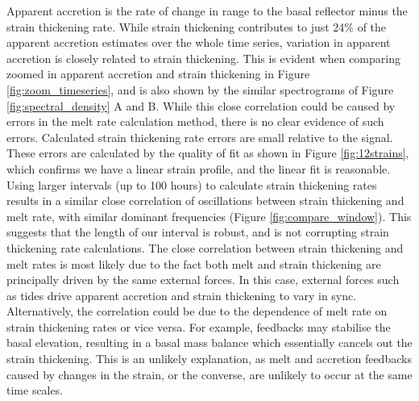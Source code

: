 Apparent accretion is the rate of change in range to the basal reflector minus the strain thickening rate. While strain thickening contributes to just 24\% of the apparent accretion estimates over the whole time series, variation in apparent accretion is closely related to strain thickening. This is evident when comparing zoomed in apparent accretion and strain thickening in Figure \ref{fig:zoom_timeseries}, and is also shown by the similar spectrograms of Figure \ref{fig:spectral_density} A and B. While this close correlation could be caused by errors in the melt rate calculation method, there is no clear evidence of such errors. Calculated strain thickening rate errors are small relative to the signal. These errors are calculated by the quality of fit as shown in Figure \ref{fig:12strains}, which confirms we have a linear strain profile, and the linear fit is reasonable. 
Using larger intervals (up to 100 hours) to calculate strain thickening rates results in a similar close correlation of oscillations between strain thickening and melt rate, with similar dominant frequencies (Figure \ref{fig:compare_window}). This suggests that the length of our interval is robust, and is not corrupting strain thickening rate calculations. 
The close correlation between strain thickening and melt rates is most likely due to the fact both melt and strain thickening are principally driven by the same external forces. In this case, external forces such as tides drive apparent accretion and strain thickening to vary in sync. Alternatively, the correlation could be due to the dependence of melt rate on strain thickening rates or vice versa.  For example, feedbacks may stabilise the basal elevation,  resulting in a basal mass balance which essentially cancels out the strain thickening. This is an unlikely explanation, as melt and accretion feedbacks caused by changes in the strain, or the converse, are unlikely to occur at the same time scales. 

